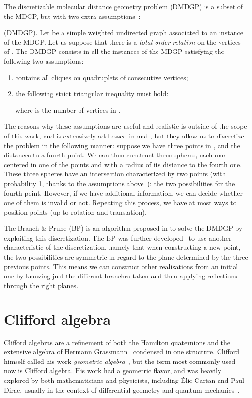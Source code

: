 \documentclass{proc}
\begin{document}
The discretizable molecular distance geometry problem (DMDGP) is a subset of the MDGP, but with two extra assumptions~\cite{dmdgp}:
\begin{definition}
(DMDGP). Let  be a simple weighted undirected graph associated to an instance of the MDGP. Let us suppose that there is a \textit{total order relation} on the vertices of . The DMDGP consists in all the instances of the MDGP satisfying the following two assumptions:
\begin{enumerate}
\item  contains all cliques on quadruplets of consecutive vertices;
\item the following strict triangular inequality must hold:

where  is the number of vertices in .
\end{enumerate}
\end{definition}

The reasons why these assumptions are useful and realistic is outside of the scope of this work, and is extensively addressed in \cite{dmdgp} and \cite{survey}, but they allow us to discretize the problem in the following manner: suppose we have three points in , and the distances to a fourth point.
We can then construct three spheres, each one centered in one of the points and with a radius of its distance to the fourth one. These three spheres have an intersection characterized by two points (with probability 1, thanks to the assumptions above~\cite{survey}): the two possibilities for the fourth point.
However, if we have additional information, we can decide whether one of them is invalid or not.
Repeating this process, we have at most  ways to position  points (up to rotation and translation).


The Branch \& Prune (BP) is an algorithm proposed in \cite{itor2008} to solve the DMDGP by exploiting this discretization.
The BP was further developed~\cite{symmbp} to use another characteristic of the discretization, namely that when constructing a new point, the two possibilities are symmetric in regard to the plane determined by the three previous points. This means we can construct other realizations from an initial one by knowing just the different branches taken and then applying reflections through the right planes.


\section{Clifford algebra}
Clifford algebras are a refinement of both the Hamilton quaternions and the extensive algebra of Hermann Grassmann~\cite{grassmann} condensed in one structure.
Clifford himself called his work \textit{geometric algebra}~\cite{clifford}, but the term most commonly used now is Clifford algebra. His work had a geometric flavor, and was heavily explored by both mathematicians and physicists, including \'Elie Cartan and Paul Dirac, usually in the context of differential geometry and quantum mechanics~\cite{Dorst2007}.
\end{document}
